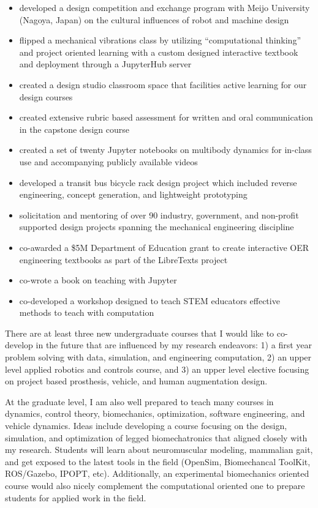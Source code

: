 \documentclass{article}
\begin{document}
\begin{itemize}
    \setlength\itemsep{0.1em}
  \item developed a design competition and exchange program with Meijo
    University (Nagoya, Japan) on the cultural influences of robot and machine
    design
  \item flipped a mechanical vibrations class by utilizing ``computational
    thinking'' and project oriented learning with a custom designed interactive
    textbook and deployment through a JupyterHub server
  \item created a design studio classroom space that facilities active learning
    for our design courses
  \item created extensive rubric based assessment for written and oral
    communication in the capstone design course
  \item created a set of twenty Jupyter notebooks on multibody dynamics for
    in-class use and accompanying publicly available videos
  \item developed a transit bus bicycle rack design project which included
    reverse engineering, concept generation, and lightweight prototyping
  \item solicitation and mentoring of over 90 industry, government, and
    non-profit supported design projects spanning the mechanical engineering
    discipline
  \item co-awarded a \$5M Department of Education grant to create interactive
    OER engineering textbooks as part of the LibreTexts project
  \item co-wrote a book on teaching with Jupyter
  \item co-developed a workshop designed to teach STEM educators effective
    methods to teach with computation
\end{itemize}

There are at least three new undergraduate courses that I would like to
co-develop in the future that are influenced by my research endeavors: 1) a
first year problem solving with data, simulation, and engineering computation,
2) an upper level applied robotics and controls course, and 3) an upper level
elective focusing on project based prosthesis, vehicle, and human augmentation
design.

At the graduate level, I am also well prepared to teach many courses in
dynamics, control theory, biomechanics, optimization, software engineering, and
vehicle dynamics. Ideas include developing a course focusing on the design,
simulation, and optimization of legged biomechatronics that aligned closely
with my research. Students will learn about neuromuscular modeling, mammalian
gait, and get exposed to the latest tools in the field (OpenSim, Biomechancal
ToolKit, ROS/Gazebo, IPOPT, etc). Additionally, an experimental biomechanics
oriented course would also nicely complement the computational oriented one to
prepare students for applied work in the field.
\end{document}
